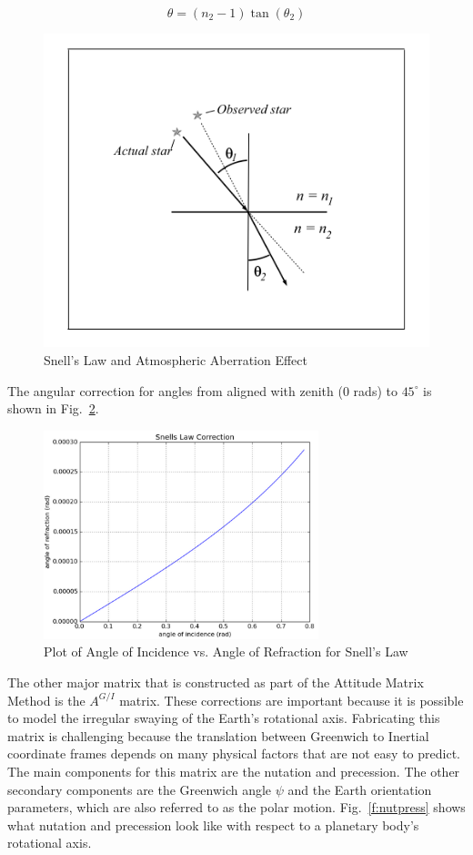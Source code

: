 \documentclass[12pt,a4paper]{book}
\begin{document}
\begin{equation}
\theta = (n_{2} - 1)\tan(\theta_{2})
\end{equation}
\begin{figure}[h!]
\centering
\includegraphics[scale=0.4]{snells.png}
\caption{Snell's Law and Atmospheric Aberration Effect}
\label{f:snells}
\end{figure}
The angular correction for angles from aligned with zenith (0 rads) to $45^{\circ}$ is shown in Fig.~\ref{f:snellgraph}.
\begin{figure}[h!]
\centering
\includegraphics[width=8cm]{snellGraph.png}
\caption{Plot of Angle of Incidence vs. Angle of Refraction for Snell's Law}
\label{f:snellgraph}
\end{figure}
The other major matrix that is constructed as part of the Attitude Matrix Method is the $A^{G/I}$ matrix.  These corrections are important because it is possible to model the irregular swaying of the Earth's rotational axis. Fabricating this matrix is challenging because the translation between Greenwich to Inertial coordinate frames depends on many physical factors that are not easy to predict.  The main components for this matrix are the nutation and precession.  The other secondary components are the Greenwich angle $\psi$ and the Earth orientation parameters, which are also referred to as the polar motion. Fig.~\ref{f:nutpress} shows what nutation and precession look like with respect to a planetary body's rotational axis.
\end{document}
